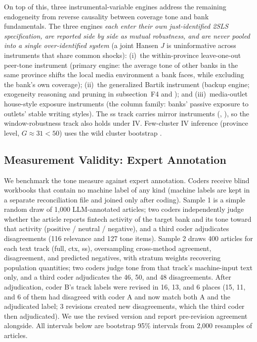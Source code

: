 On top of this, three instrumental-variable engines address the
remaining endogeneity from reverse causality between coverage tone and
bank fundamentals. The three engines \emph{each enter their own
just-identified 2SLS specification, are reported side by side as
mutual robustness, and are never pooled into a single over-identified
system} (a joint Hansen $J$ is uninformative across instruments that
share common shocks): (i)~the within-province leave-one-out peer-tone
instrument  (primary engine: the
average tone of other banks in the same province shifts the local
media environment a bank faces, while excluding the bank's own
coverage); (ii)~the generalized Bartik instrument
 (backup engine; exogeneity reasoning and
pruning in subsection~F4 and \textcite{goldsmith2020bartik}); and
(iii)~media-outlet house-style exposure instruments (the
 column family: banks' passive exposure to
outlets' stable writing styles). The ss track carries mirror
instruments (,
), so the window-robustness track also
holds under IV. Few-cluster IV inference (province level,
$G \approx 31 < 50$) uses the wild cluster bootstrap
\parencite{mackinnon2017wild, wang2024wildiv}.


\subsection{Measurement Validity: Expert Annotation}
\label{sec:validity}
We benchmark the tone measure against expert annotation. Coders receive
blind workbooks that contain no machine label of any kind (machine labels
are kept in a separate reconciliation file and joined only after coding).
Sample 1 is a simple random draw of 1{,}000 LLM-annotated articles; two
coders independently judge whether the article reports fintech activity of
the target bank and its tone toward that activity (positive / neutral /
negative), and a third coder adjudicates disagreements (116 relevance and
127 tone items). Sample 2 draws 400 articles for each text track (full,
ctx, ss), oversampling cross-method agreement, disagreement, and predicted
negatives, with stratum weights recovering population quantities; two coders
judge tone from that track's machine-input text only, and a third coder
adjudicates the 46, 50, and 48 disagreements. After adjudication, coder B's
track labels were revised in 16, 13, and 6 places (15, 11, and 6 of them had
disagreed with coder A and now match both A and the adjudicated label; 3
revisions created new disagreements, which the third coder then
adjudicated). We use the revised version and report pre-revision
agreement alongside. All intervals below are
bootstrap 95\% intervals from 2{,}000 resamples of articles.

